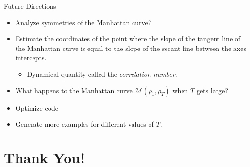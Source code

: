 \documentclass{beamer}
\begin{document}
	\begin{frame}{Future Directions}
		\begin{itemize}
			\item<+-> Analyze symmetries of the Manhattan curve?
			\item<+-> Estimate the coordinates of the point where the slope of the tangent line of the Manhattan curve is equal to the slope of the secant line between the axes intercepts.
			\begin{itemize}
				\item<+-> Dynamical quantity called the \emph{correlation number}.
			\end{itemize}
			\item<+-> What happens to the Manhattan curve $\mathcal{M}(\rho_1, \rho_T)$ when $T$ gets large?
			\item<+-> Optimize code
			\item<+-> Generate more examples for different values of $T$.
		\end{itemize}
	\end{frame}
	
	\section{Thank You!}
\end{document}
